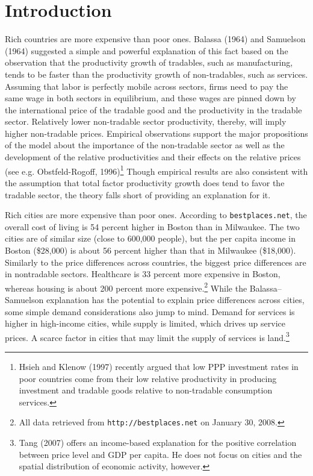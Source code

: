 \documentclass[12pt]{article}
\begin{document}
\section{Introduction}
Rich countries are more expensive than poor ones. Balassa (1964) and Samuelson
(1964) suggested a simple and powerful explanation of this fact based on the
observation that the productivity growth of tradables, such as manufacturing,
tends to be faster than the productivity growth of non-tradables, such as
services. Assuming that labor is perfectly mobile across sectors,
firms need to pay the same wage in both sectors in equilibrium, and
these wages are pinned down by the international price of the
tradable good and the productivity in the tradable sector.
Relatively lower non-tradable sector productivity, thereby, will
imply higher non-tradable prices. Empirical observations support the
major propositions of the model about the importance of the
non-tradable sector as well as the development of the relative
productivities and their effects on the relative prices (see e.g.
Obstfeld-Rogoff, 1996)\footnote{Hsieh and Klenow (1997) recently
argued that low PPP investment rates in poor countries come from
their low relative productivity in producing investment and tradable
goods relative to non-tradable consumption services.} Though
empirical results are also consistent with the assumption that total factor
productivity growth does tend to favor the tradable sector, the
theory falls short of providing an explanation for it.

Rich cities are more expensive than poor ones. According to \texttt{bestplaces.net}, the overall cost of living is 54 percent higher in Boston than in Milwaukee. The two cities are of similar size (close to 600,000 people), but the per capita income in Boston (\$28,000) is about 56 percent higher than that in Milwaukee (\$18,000). Similarly to the price differences across countries, the biggest price differences are in nontradable sectors. Healthcare is 33 percent more expensive in Boston, whereas housing is about 200 percent more expensive.\footnote{All data retrieved from \texttt{http://bestplaces.net} on January 30, 2008.} While the Balassa--Samuelson explanation has the potential to explain price differences across cities, some simple demand considerations also jump to mind. Demand for services is higher in high-income cities, while supply is limited, which drives up service prices. A scarce factor in cities that may limit the supply of services is land.\footnote{Tang (2007) offers an income-based explanation for the positive correlation between price level and GDP per capita. He does not focus on cities and the spatial distribution of economic activity, however.}
\end{document}
